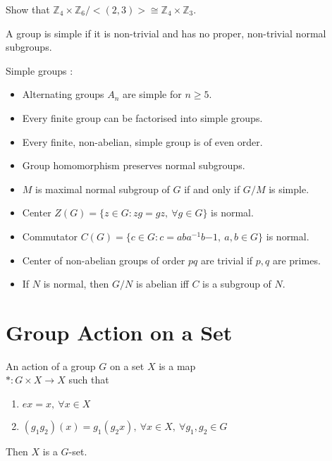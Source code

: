 \begin{question}
	Show that $\mathbb{Z}_4 \times \mathbb{Z}_6 / <(2,3)> \cong \mathbb{Z}_4 \times \mathbb{Z}_3$.
\end{question}

\begin{definition}
	A group is simple if it is non-trivial and has no proper, non-trivial normal subgroups.
\end{definition}

\begin{remark} Simple groups :
	\begin{itemize}
		\item Alternating groups $A_n$ are simple for $n \ge 5$. %
		\item Every finite group can be factorised into simple groups. %
		\item Every finite, non-abelian, simple group is of even order. %
		\item Group homomorphism preserves normal subgroups. %
		\item $M$ is maximal normal subgroup of $G$ if and only if $G/M$ is simple. %
		\item Center $Z(G) = \{ z \in G : zg = gz,\ \forall g \in G \}$ is normal. %
		\item Commutator $C(G) = \{ c \in G : c = aba^{-1}b{-1},\ a,b \in G \}$ is normal. %
		\item Center of non-abelian groups of order $pq$ are trivial if $p,q$ are primes. %
		\item If $N$ is normal, then $G/N$ is abelian iff $C$ is a subgroup of $N$. %
	\end{itemize}
\end{remark}

\pagebreak

\section{Group Action on a Set}
\begin{definition}%
	An action of a group $G$ on a set $X$ is a map\\
	$\ast : G \times X \to X$ such that
	\begin{enumerate}
		\item $ex = x,\ \forall x \in X$
		\item $(g_1g_2)(x) = g_1(g_2x),\ \forall x \in X,\ \forall g_1,g_2 \in G$
	\end{enumerate}
	Then $X$ is a $G$-set.
\end{definition}

